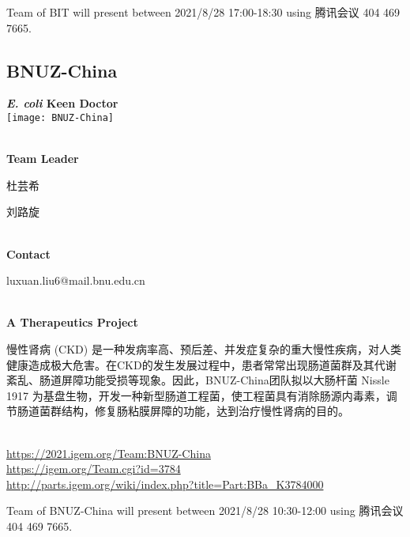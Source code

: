 \vfill{}









Team of BIT will present between        2021/8/28 17:00-18:30 using 腾讯会议 404 469 7665.
\newpage


\subsection{\textcolor{Blu}{ BNUZ-China } }
\vspace{5mm}
\begin{center}
\large{
  \textbf{ \textit{E. coli} Keen Doctor }\\

  \texttt{[image: BNUZ-China]}
}
\end{center}
\textbf{\\Team Leader}

  杜芸希

  刘路旋


\textbf{\\Contact}

  luxuan.liu6@mail.bnu.edu.cn


\textbf{\\A Therapeutics Project\\}\begin{spacing}{1.5}

慢性肾病 (CKD) 是一种发病率高、预后差、并发症复杂的重大慢性疾病，对人类健康造成极大危害。在CKD的发生发展过程中，患者常常出现肠道菌群及其代谢紊乱、肠道屏障功能受损等现象。因此，BNUZ-China团队拟以大肠杆菌 Nissle 1917 为基盘生物，开发一种新型肠道工程菌，使工程菌具有消除肠源内毒素，调节肠道菌群结构，修复肠粘膜屏障的功能，达到治疗慢性肾病的目的。\end{spacing}
\\

\url{https://2021.igem.org/Team:BNUZ-China }\\
\url{https://igem.org/Team.cgi?id=3784 }\\
\url{http://parts.igem.org/wiki/index.php?title=Part:BBa_K3784000 }\\


\vfill{}









Team of BNUZ-China will present between     2021/8/28 10:30-12:00    using 腾讯会议 404 469 7665.
\newpage


